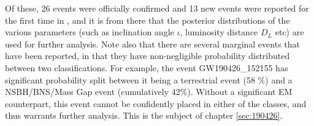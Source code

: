     Of these, 26 events were officially confirmed and 13 new events were reported for
    the first time in \cite{abbott_2020}, and it is from there that the posterior
    distributions of the various parameters (such as inclination angle $\iota$,
    luminosity distance $D_L$ etc) are used for further analysis.  Note also that there
    are several marginal events that have been reported, in that they have
    non-negligible probability distributed between two classifications. For example, the
    event GW190426\_152155 has significant probability split between it being a
    terrestrial event (58 \%) and a NSBH/BNS/Mass Gap event (cumulatively 42\%). Without
    a significant EM counterpart, this event cannot be confidently placed in either of
    the classes, and thus warrants further analysis. This is the subject of chapter
    \ref{sec:190426}.

